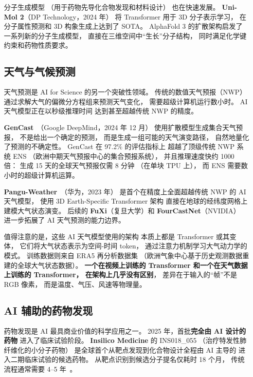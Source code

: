 分子生成模型
（用于药物先导化合物发现和材料设计）
也在快速发展。
\textbf{Uni-Mol 2}（DP Technology，2024 年）
将 Transformer 用于 3D 分子表示学习，
在分子属性预测和 3D 构象生成上达到了 SOTA。
AlphaFold 3 的扩散架构启发了
一系列新的分子生成模型，
直接在三维空间中“生长”分子结构，
同时满足化学键约束和药物性质要求。

\subsection{天气与气候预测}

天气预测是 AI for Science 的另一个突破性领域。
传统的数值天气预报（NWP）
通过求解大气的偏微分方程组来预测天气变化，
需要超级计算机运行数小时。
AI 天气模型正在以秒级推理时间
达到甚至超越传统 NWP 的精度。

\textbf{GenCast}~\cite{price2024gencast}（Google DeepMind，2024 年 12 月）
使用扩散模型生成集合天气预报，
不是给出一个确定的预测，
而是生成一组可能的天气演变路径，
自然地量化了预测的不确定性。
GenCast 在 97.2\% 的评估指标上
超越了顶级传统 NWP 系统 ENS
（欧洲中期天气预报中心的集合预报系统），
并且推理速度快约 1000 倍：
生成 15 天的全球天气预报仅需 8 分钟
（在单块 TPU 上），
而 ENS 需要数小时的超级计算机运算。

\textbf{Pangu-Weather}~\cite{bi2023pangu}（华为，2023 年）
是首个在精度上全面超越传统 NWP 的 AI 天气模型，
使用 3D Earth-Specific Transformer 架构
直接在地球的经纬度网格上建模大气状态演变。
后续的 \textbf{FuXi}（复旦大学）和
\textbf{FourCastNet}（NVIDIA）
进一步拓展了 AI 天气预测的能力边界。

值得注意的是，这些 AI 天气模型使用的架构
本质上都是 Transformer 或其变体，
它们将大气状态表示为空间-时间 token，
通过注意力机制学习大气动力学的模式。
训练数据则来自 ERA5 再分析数据集
（欧洲气象中心基于历史观测数据重建的全球大气状态数据）。
\textbf{一个在视频上训练的 Transformer
和一个在天气数据上训练的 Transformer，
在架构上几乎没有区别}，
差异在于输入的“帧”不是 RGB 像素，
而是温度、气压、风速等物理量。

\subsection{AI 辅助的药物发现}

药物发现是 AI 最具商业价值的科学应用之一。
2025 年，首批\textbf{完全由 AI 设计的药物}
进入了临床试验阶段。
\textbf{Insilico Medicine} 的 INS018\_055
（治疗特发性肺纤维化的小分子药物）
是全球首个从靶点发现到化合物设计全程由 AI 主导的
进入二期临床试验的候选药物。
从靶点识别到候选分子提名仅耗时 18 个月，
传统流程通常需要 4--5 年~\cite{zhavoronkov2019deep}。

